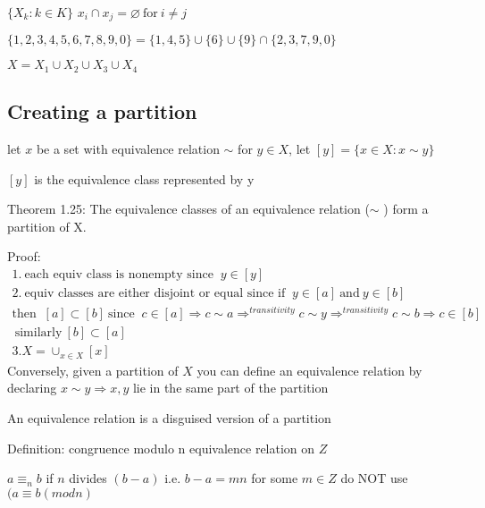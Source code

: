 \documentclass[class=scrartcl, crop=false]{standalone}
\begin{document}
\begin{example}
 $\{X_k: k \in K \}$
 $x_i \cap x_j = \varnothing \ \text{for} \ i \neq j$

$\{1, 2, 3, 4, 5, 6, 7, 8, 9, 0 \} = \{1, 4, 5\} \cup \{6\} \cup \{9\} \cap \{2, 3, 7, 9, 0 \}$

$X = X_1 \cup X_2 \cup X_3 \cup X_4 $

\end{example}

\subsection{Creating a partition}

let $x$ be a set with equivalence relation $\sim$ 
for $y \in X$, let $[y] = \{x \in X : x \sim y \}$

$[y]$ is the equivalence class represented by y

\begin{theorem}
    Theorem 1.25: The equivalence classes of an equivalence relation ($\sim$ ) form a partition of X.
\end{theorem}

Proof:
\begin{gather*}
1. \ \text{each equiv class is nonempty since } \ y \in [y] \\
2. \ \text{equiv classes are either disjoint or equal since if } \ y \in [a] \ \text{and} \ y \in [b] \ \\
\text{then } \ [a] \subset [b] \ \text{since } \ c \in [a] \Rightarrow c \sim a \Rightarrow^{transitivity} c \sim y \Rightarrow^{transitivity} c \sim b \Rightarrow c \in [b] \\
  \ \text{similarly} \ [b] \subset [a] \\
3. X = \cup_{x \in X} [x]
\end{gather*} 
Conversely, given a partition of $X$ you can define an equivalence relation by declaring $x \sim y \Rightarrow x, y $ lie in the same part of the partition

\begin{note}
An equivalence relation is a disguised version of a partition
\end{note}

\begin{definition}
Definition: congruence modulo n equivalence relation on $Z$ 
\end{definition}

$a \equiv_n b$ if  $n$ divides $(b - a)$ 
i.e. $b - a =  mn$ for some $m \in Z$ 
do NOT use $(a \equiv b(mod n)$ 
\end{document}
